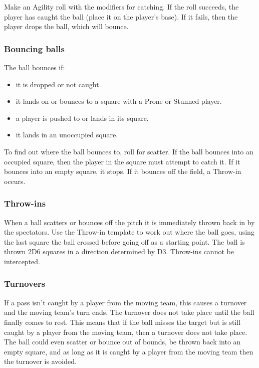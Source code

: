 \begin{multicols}{2}
\par Make an Agility roll with the modifiers for catching. If the roll succeeds, the player has caught the ball (place it on the player's base). If it fails, then the player drops the ball, which will bounce.

\subsubsection{Bouncing balls}
\par The ball bounces if:

\begin{itemize}
\item it is dropped or not caught.
\item it lands on or bounces to a square with a Prone or Stunned player.
\item a player is pushed to or lands in its square.
\item it lands in an unoccupied square.
\end{itemize}

\par To find out where the ball bounces to, roll for scatter. If the ball bounces into an occupied square, then the player in the square must attempt to catch it. If it bounces into an empty square, it stops. If it bounces off the field, a Throw-in occurs.

\subsubsection{Throw-ins}
\par When a ball scatters or bounces off the pitch it is immediately thrown back in by the spectators. Use the Throw-in template to work out where the ball goes, using the last square the ball crossed before going off as a starting point. The ball is thrown 2D6 squares in a direction determined by D3. Throw-ins cannot be intercepted.

\subsubsection{Turnovers}
\par If a pass isn't caught by a player from the moving team, this causes a turnover and the moving team's turn ends. The turnover does not take place until the ball finally comes to rest. This means that if the ball misses the target but is still caught by a player from the moving team, then a turnover does not take place. The ball could even scatter or bounce out of bounds, be thrown back into an empty square, and as long as it is caught by a player from the moving team then the turnover is avoided.


\end{multicols}
